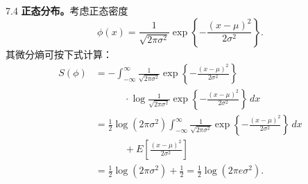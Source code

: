 \begin{bookexample}{7.4}
\textbf{正态分布。}考虑正态密度
\[
\phi(x)=\frac1{\sqrt{2\pi\sigma^2}}\exp\left\{-\frac{(x-\mu)^2}{2\sigma^2}\right\}.
\]
其微分熵可按下式计算：
\begin{equation}
\begin{aligned}
S(\phi)&=-\int_{-\infty}^\infty\frac1{\sqrt{2\pi\sigma^2}}
\exp\left\{-\frac{(x-\mu)^2}{2\sigma^2}\right\}\\
&\hspace{3em}\cdot\log\frac1{\sqrt{2\pi\sigma^2}}
\exp\left\{-\frac{(x-\mu)^2}{2\sigma^2}\right\}\,dx\\
&=\frac12\log(2\pi\sigma^2)\int_{-\infty}^\infty\frac1{\sqrt{2\pi\sigma^2}}
\exp\left\{-\frac{(x-\mu)^2}{2\sigma^2}\right\}\,dx\\
&\hspace{3em}+E\left[\frac{(x-\mu)^2}{2\sigma^2}\right]\\
&=\frac12\log(2\pi\sigma^2)+\frac12
=\frac12\log(2\pi e\sigma^2).
\end{aligned}
\tag{7.15}
\end{equation}
\end{bookexample}

